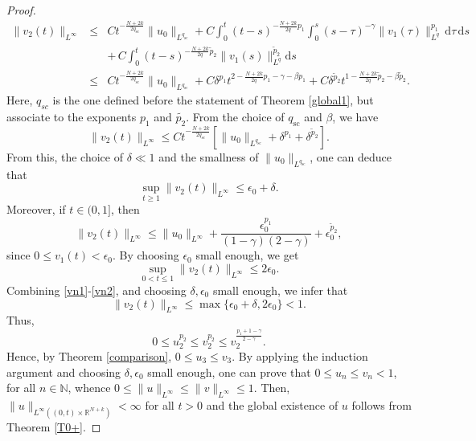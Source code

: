 \documentclass[a4,psfig,english,12pt,epsf,portrait]{article}
\numberwithin{equation}{section}
\def\N{\mathbb{N}}
\begin{document}
\begin{proof}
	\begin{eqnarray*}
		\|v_2(t)\|_{L^{\infty}}&\leq & C t^{-\frac{N+2k}{2q_{\mathrm{sc}}}} \|u_0\|_{L^{q_{\mathrm{sc}}}} +
		C\int_{0}^{t} (t-s)^{-\frac{N+2k}{2q}p_1} \int_0^s (s-\tau)^{-\gamma} \|v_1(\tau)\|^{p_1}_{L^{q}} \, \mathrm{d}\tau \,\mathrm{d}s  \\
		&{}& +\, C \int_{0}^{t}(t-s)^{-\frac{N+2k}{2q}\tilde{p}_2} \|v_1(s)\|^{\tilde{p}_2}_{L^{q}} \mathrm{d}s \\
		&\leq& C t^{-\frac{N+2k}{2q_{\mathrm{sc}}}} \|u_0\|_{L^{q_{\mathrm{sc}}}}  + C \delta^{p_1}  t^{2-\frac{N+2k}{2q}p_1 - \gamma - \beta p_1} + C \delta^{\tilde{p}_2}  t^{1-\frac{N+2k}{2q} \tilde{p}_2-\beta \tilde{p}_2} .
	\end{eqnarray*}
	Here, $q_{sc}$ is the one defined before the statement of Theorem \ref{global1}, but associate to the exponents $p_1$ and $\tilde{p_2}$. From the choice of $q_{\mathrm{sc}}$ and $\beta$, we have
	$$
	\|v_2(t)\|_{L^{\infty}}  \leq C t^{-\frac{N+2k}{2q_{\mathrm{sc}}}} \left[\|u_0\|_{L^{q_{\mathrm{sc}}}}  +  \delta^{p_1}  + \delta^{\tilde{p}_2} \right] .
	$$
	From this, the choice of $\delta\ll 1$ and the smallness of $\|u_0\|_{L^{q_{\mathrm{sc}}}} $, one can deduce that
	\begin{equation}\label{vn1}
		\sup_{t\geq1}\|v_2(t)\|_{L^{\infty}}  \leq \epsilon_0+\delta.
	\end{equation}
	Moreover, if $t\in(0,1]$, then
	\begin{equation*}
		\|v_2(t)\|_{L^{\infty}}  \leq  \|u_0\|_{L^{\infty}}  +  \frac{\epsilon_0^{p_1}}{(1-\gamma)(2-\gamma)}  + \epsilon_0^{\tilde{p}_2}  ,
	\end{equation*}
	since $0\leq v_1(t)<\epsilon_0$. By choosing $\epsilon_0$ small enough, we get
	\begin{equation}\label{vn2}
		\sup_{0<t\leq1}\|v_2(t)\|_{L^{\infty}}  \leq 2\epsilon_0.
	\end{equation}
	Combining \eqref{vn1}-\eqref{vn2}, and choosing $\delta,\epsilon_0$ small enough, we infer that 
	$$
	\|v_{2}(t)\|_{L^{\infty}}  \leq \max\{\epsilon_0+\delta,2\epsilon_0\}<1.
	$$
	Thus, 
	$$0\leq u_2^{p_2}\leq v_2^{p_2}\leq  v_2^{\frac{p_1+1-\gamma}{2-\gamma}}.$$ 
	Hence, by Theorem \ref{comparison}, $0\leq u_3\leq v_3$. By applying the induction argument and choosing $\delta,\epsilon_0$ small enough, one can prove that $0\leq u_n\leq v_n<1$, for all $n\in\N$, whence $0\leq \|u\|_{L^{\infty}}\leq  \|v\|_{L^{\infty}}\leq 1$. Then, $\|u\|_{L^\infty((0,t)\times\mathbb{R}^{N+k})}<\infty$ for all $t>0$ and the global existence of $u$ follows from Theorem \ref{T0+}.
	

\end{proof}
\end{document}
